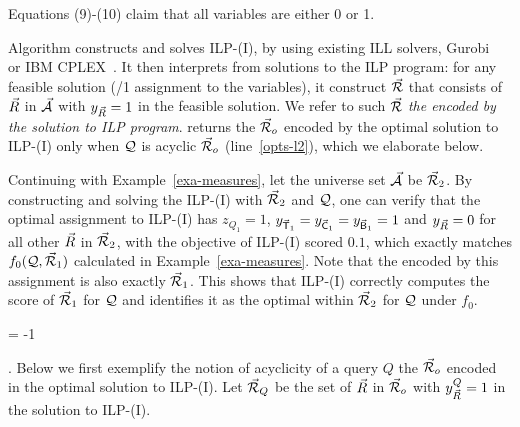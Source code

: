 \vspace{0.6ex}
Equations (9)-(10) claim that all variables are either 0 or 1.


\vspace{1.6ex}
Algorithm \opts constructs and solves ILP-(I), 
by using existing ILL solvers, \eg Gurobi~\cite{gurobi} or
IBM CPLEX~\cite{cplex}.
%
It then interprets \bdss from solutions to the ILP
program: for any feasible solution (/1 assignment to the
variables), it construct \bds $\vec{{\mathcal R}}$ that consists of \bss
$\vec{R}$ in $\vec{{\mathcal A}}$ with $y_{\vec{R}}  = 1$ in the feasible
solution. We refer to such $\vec{{\mathcal R}}$ {\em the \bds encoded by the
solution to ILP program}. \opts returns the \bds
$\vec{{\mathcal R}}_{o}$ encoded by the optimal solution to ILP-(I) only
when $\mathcal Q$ is acyclic \wrt $\vec{{\mathcal R}}_{o}$ (line~\ref{opts-l2}), which we elaborate below. 


\begin{example}\label{exa-ILP-I}
Continuing with Example~\ref{exa-measures},
let the universe set $\vec{{\mathcal A}}$ be $\vec{{\mathcal R}}_{2}$.
By constructing and solving the ILP-(I) with $\vec{{\mathcal R}}_{2}$ and $\mathcal Q$,
one can verify that the optimal assignment to ILP-(I) has
$z_{Q_{1}} = 1$, $y_{\vec{\protect\mathsf{T}}_{1}} = y_{\vec{\protect\mathsf{C}}_{1}} =
y_{\vec{\protect\mathsf{B}}_{1}} = 1$ and $y_{\vec{R}} = 0$ for all other
$\vec{R}$ in $\vec{{\mathcal R}}_{2}$, with the objective of ILP-(I) scored $0.1$, which
exactly matches $f_{0}(\mathcal Q, \vec{{\mathcal R}}_{1})$ calculated in Example~\ref{exa-measures}.
Note that the encoded \bds by this assignment is also exactly
$\vec{{\mathcal R}}_{1}$. This shows that ILP-(I) correctly computes the
score of $\vec{{\mathcal R}}_{1}$ for $\mathcal Q$ and identifies it as the optimal
\bds within $\vec{{\mathcal R}}_{2}$ for $\mathcal Q$ under $f_{0}$. 
\end{example}
\looseness = -1


. Below we
first exemplify the notion
of acyclicity of a query $Q$ \wrt the \bds $\vec{{\mathcal R}}_{o}$ encoded
in the optimal solution to ILP-(I). Let $\vec{{\mathcal R}}_{Q}$ be the set
of \bss $\vec{R}$ in $\vec{{\mathcal R}}_{o}$ with $y_{\vec{R}}^{Q} = 1$ in
the solution to ILP-(I).


